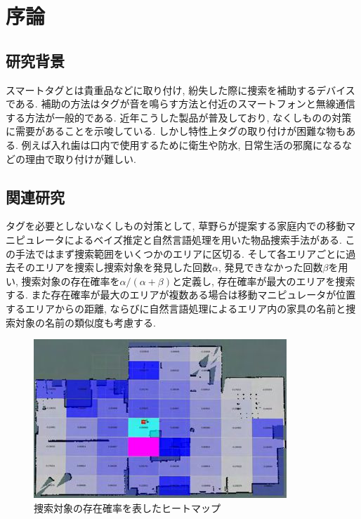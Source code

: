 \chapter{序論}

\section{研究背景}
スマートタグとは貴重品などに取り付け, 紛失した際に捜索を補助するデバイスである. 
補助の方法はタグが音を鳴らす方法と付近のスマートフォンと無線通信する方法が一般的である. 
近年こうした製品が普及しており, なくしものの対策に需要があることを示唆している. 
しかし特性上タグの取り付けが困難な物もある. 
例えば入れ歯は口内で使用するために衛生や防水, 日常生活の邪魔になるなどの理由で取り付けが難しい. 

\section{関連研究}
タグを必要としないなくしもの対策として, 草野らが提案する家庭内での移動マニピュレータによるベイズ推定と自然言語処理を用いた物品捜索手法\cite{kusano}がある. 
この手法ではまず捜索範囲をいくつかのエリアに区切る. 
そして各エリアごとに過去そのエリアを捜索し捜索対象を発見した回数$\alpha$, 発見できなかった回数$\beta$を用い, 
捜索対象の存在確率を$ \alpha / (\alpha + \beta)$と定義し, 存在確率が最大のエリアを捜索する. 
また存在確率が最大のエリアが複数ある場合は移動マニピュレータが位置するエリアからの距離, ならびに自然言語処理によるエリア内の家具の名前と捜索対象の名前の類似度も考慮する. 

\begin{figure}[H]
    \begin{center}
        \includegraphics[width=0.8\linewidth]{figs/kusano.jpg}
        \caption{捜索対象の存在確率を表したヒートマップ}
        \label{fig:kusano}
    \end{center}
\end{figure}

